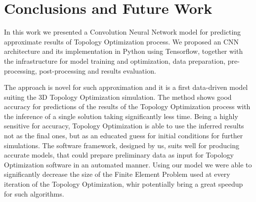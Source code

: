 
\chapter{Conclusions and Future Work}
\label{chapter:Conclusion}

In this work we presented a Convolution Neural Network model for predicting approximate results of Topology Optimization process.
We proposed an CNN architecture and its implementation in Python using Tensorflow, together with the infrastructure for model  training and optimization, data preparation, pre-processing, post-processing and results evaluation.
\medskip

The approach is novel for such approximation and it is a first data-driven model suiting the 3D Topology Optimization simulation.
The method shows good accuracy for predictions of the results of the Topology Optimization process with the inference of a single solution taking significantly less time.
Being a highly sensitive for accuracy, Topology Optimization is able to use the inferred results not as the final ones, but as an educated guess for initial conditions for further simulations. 
The software framework, designed by us, suits well for producing accurate models, that could prepare preliminary data as input for Topology Optimization software in an automated manner.
Using our model we were able to significantly decrease the size of the Finite Element Problem used at every iteration of the Topology Optimization, whir potentially bring a great speedup for such algorithms. 
